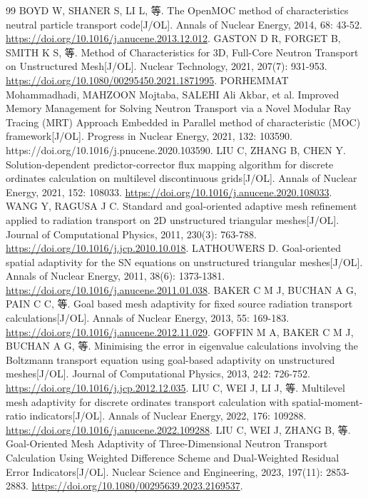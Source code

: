 \documentclass[UTF8, zihao=-4, fontset=none, a4paper]{ctexart}
\begin{document}
\begin{thebibliography}{99}
 BOYD W, SHANER S, LI L, 等. The OpenMOC method of characteristics neutral particle transport code{[}J/OL{]}. Annals of Nuclear Energy, 2014, 68: 43-52. \url{https://doi.org/10.1016/j.anucene.2013.12.012}.
 GASTON D R, FORGET B, SMITH K S, 等. Method of Characteristics for 3D, Full-Core Neutron Transport on Unstructured Mesh{[}J/OL{]}. Nuclear Technology, 2021, 207(7): 931-953. \url{https://doi.org/10.1080/00295450.2021.1871995}.
 PORHEMMAT Mohammadhadi, MAHZOON Mojtaba, SALEHI Ali Akbar, et al. Improved Memory Management for Solving Neutron Transport via a Novel Modular Ray Tracing (MRT) Approach Embedded in Parallel method of characteristic (MOC) framework{[}J/OL{]}. Progress in Nuclear Energy, 2021, 132: 103590. https://doi.org/10.1016/j.pnucene.2020.103590.
 LIU C, ZHANG B, CHEN Y. Solution-dependent predictor-corrector flux mapping algorithm for discrete ordinates calculation on multilevel discontinuous grids{[}J/OL{]}. Annals of Nuclear Energy, 2021, 152: 108033. \url{https://doi.org/10.1016/j.anucene.2020.108033}.
 WANG Y, RAGUSA J C. Standard and goal-oriented adaptive mesh refinement applied to radiation transport on 2D unstructured triangular meshes{[}J/OL{]}. Journal of Computational Physics, 2011, 230(3): 763-788. \url{https://doi.org/10.1016/j.jcp.2010.10.018}.
 LATHOUWERS D. Goal-oriented spatial adaptivity for the SN equations on unstructured triangular meshes{[}J/OL{]}. Annals of Nuclear Energy, 2011, 38(6): 1373-1381. \url{https://doi.org/10.1016/j.anucene.2011.01.038}.
 BAKER C M J, BUCHAN A G, PAIN C C, 等. Goal based mesh adaptivity for fixed source radiation transport calculations{[}J/OL{]}. Annals of Nuclear Energy, 2013, 55: 169-183. \url{https://doi.org/10.1016/j.anucene.2012.11.029}.
 GOFFIN M A, BAKER C M J, BUCHAN A G, 等. Minimising the error in eigenvalue calculations involving the Boltzmann transport equation using goal-based adaptivity on unstructured meshes{[}J/OL{]}. Journal of Computational Physics, 2013, 242: 726-752. \url{https://doi.org/10.1016/j.jcp.2012.12.035}.
 LIU C, WEI J, LI J, 等. Multilevel mesh adaptivity for discrete ordinates transport calculation with spatial-moment-ratio indicators{[}J/OL{]}. Annals of Nuclear Energy, 2022, 176: 109288. \url{https://doi.org/10.1016/j.anucene.2022.109288}.
 LIU C, WEI J, ZHANG B, 等. Goal-Oriented Mesh Adaptivity of Three-Dimensional Neutron Transport Calculation Using Weighted Difference Scheme and Dual-Weighted Residual Error Indicators{[}J/OL{]}. Nuclear Science and Engineering, 2023, 197(11): 2853-2883. \url{https://doi.org/10.1080/00295639.2023.2169537}.

\end{thebibliography}
\end{document}
